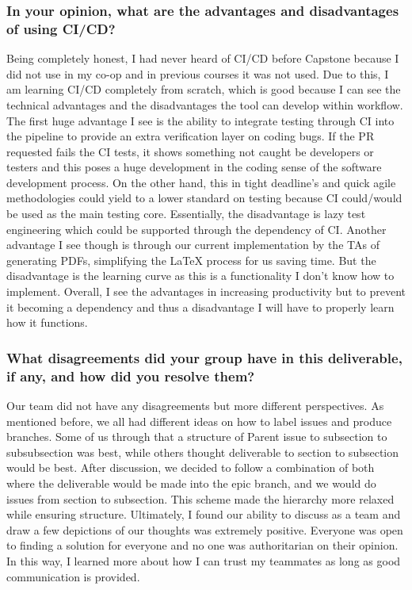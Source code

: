 \documentclass{article}
\begin{document}
\subsubsection*{In your opinion, what are the advantages and disadvantages of using CI/CD?}
Being completely honest, I had never heard of CI/CD before Capstone because I did 
not use in my co-op and in previous courses it was not used. Due to this, I am 
learning CI/CD completely from scratch, which is good because I can see the 
technical advantages and the disadvantages the tool can develop within workflow. 
The first huge advantage I see is the ability to integrate testing through CI into 
the pipeline to provide an extra verification layer on coding bugs. If the PR requested 
fails the CI tests, it shows something not caught be developers or testers and this 
poses a huge development in the coding sense of the software development process. On 
the other hand, this in tight deadline's and quick agile methodologies could yield to 
a lower standard on testing because CI could/would be used as the main testing core. Essentially, 
the disadvantage is lazy test engineering which could be supported through the dependency of 
CI. Another advantage I see though is through our current implementation by the TAs 
of generating PDFs, simplifying the LaTeX process for us saving time. But the disadvantage 
is the learning curve as this is a functionality I don't know how to implement. Overall, 
I see the advantages in increasing productivity but to prevent it becoming a dependency 
and thus a disadvantage I will have to properly learn how it functions.

\subsubsection*{What disagreements did your group have in this deliverable, if any, and how did you resolve them?}
Our team did not have any disagreements but more different perspectives. As 
mentioned before, we all had different ideas on how to label issues and produce 
branches. Some of us through that a structure of Parent issue to subsection to 
subsubsection was best, while others thought deliverable to section to subsection 
would be best. After discussion, we decided to follow a combination of both where 
the deliverable would be made into the epic branch, and we would do issues from 
section to subsection. This scheme made the hierarchy more relaxed while ensuring 
structure. Ultimately, I found our ability to discuss as a team and draw a few 
depictions of our thoughts was extremely positive. Everyone was open to finding 
a solution for everyone and no one was authoritarian on their opinion. In this 
way, I learned more about how I can trust my teammates as long as good communication 
is provided.
\end{document}
